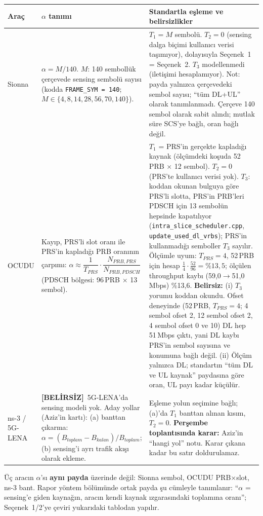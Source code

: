 \documentclass[10.5pt,a4paper]{article}
\newcommand{\bel}{{\color{warn}\textbf{[BELİRSİZ]}}}
\begin{document}
\begingroup\sffamily\small
\begin{xltabular}{\textwidth}{@{}p{1.7cm}p{4.3cm}X@{}}
\toprule
\textbf{Araç} & \textbf{$\alpha$ tanımı} & \textbf{Standartla eşleme ve belirsizlikler} \\
\midrule
Sionna & $\alpha = M/140$. $M$: 140 sembollük çerçevede sensing sembolü sayısı (kodda \texttt{FRAME\_SYM = 140}; $M\in\{4,8,14,28,56,70,140\}$). & $T_1=M$ sembolü. $T_2=0$ (sensing dalga biçimi kullanıcı verisi taşımıyor), dolayısıyla Seçenek~1 = Seçenek~2. $T_3$ modellenmedi (iletişimi hesaplamıyor). Not: payda yalnızca çerçevedeki sembol sayısı; ``tüm DL+UL'' olarak tanımlanmadı. Çerçeve 140 sembol olarak sabit alındı; mutlak süre SCS'ye bağlı, oran bağlı değil. \\
\addlinespace
OCUDU & Kayıp, PRS'li slot oranı ile PRS'in kapladığı PRB oranının çarpımı: $\alpha\approx \dfrac{1}{T_{PRS}}\cdot\dfrac{N_{PRB,PRS}}{N_{PRB,PDSCH}}$ (PDSCH bölgesi: 96\,PRB $\times$ 13 sembol). & $T_1$ = PRS'in gerçekte kapladığı kaynak (ölçümdeki koşuda 52\,PRB $\times$ 12 sembol). $T_2=0$ (PRS'te kullanıcı verisi yok). $T_3$: koddan okunan bulguya göre PRS'li slotta, PRS'in PRB'leri PDSCH için 13 sembolün hepsinde kapatılıyor (\texttt{intra\_slice\_scheduler.cpp}, \texttt{update\_used\_dl\_vrbs}); PRS'in kullanmadığı semboller $T_3$ sayılır. Ölçümle uyum: $T_{PRS}=4$, 52\,PRB için hesap $\tfrac14\cdot\tfrac{52}{96}=\%13{,}5$; ölçülen throughput kaybı (59,0$\to$51,0\,Mbps) \%13,6. \textbf{Belirsiz:} (i) $T_3$ yorumu koddan okundu. Ofset deneyinde (52\,PRB, $T_{PRS}=4$; 4 sembol ofset 2, 12 sembol ofset 2, 4 sembol ofset 0 ve 10) DL hep 51\,Mbps çıktı, yani DL kaybı PRS'in sembol sayısına ve konumuna bağlı değil. (ii) Ölçüm yalnızca DL; standartın ``tüm DL ve UL kaynak'' paydasına göre oran, UL payı kadar küçülür. \\
\addlinespace
ns-3 / 5G-LENA & \bel\ 5G-LENA'da sensing modeli yok. Aday yollar (Aziz'in kartı): (a) banttan çıkarma: $\alpha = (B_{toplam}-B_{kalan})/B_{toplam}$; (b) sensing'i ayrı trafik akışı olarak ekleme. & Eşleme yolun seçimine bağlı; (a)'da $T_1$ banttan alınan kısım, $T_2=0$. \textbf{Perşembe toplantısında karar:} Aziz'in ``hangi yol'' notu. Karar çıkana kadar bu satır doldurulamaz. \\
\bottomrule
\end{xltabular}
\endgroup

\begin{dikkat}
Üç aracın $\alpha$'sı \textbf{aynı payda} üzerinde değil: Sionna sembol, OCUDU PRB$\times$slot, ns-3 bant. Rapor yöntem bölümünde ortak payda şu cümleyle tanımlanır: ``$\alpha$ = sensing'e giden kaynağın, aracın kendi kaynak ızgarasındaki toplamına oranı''; Seçenek~1/2'ye çeviri yukarıdaki tablodan yapılır.
\end{dikkat}
\end{document}
